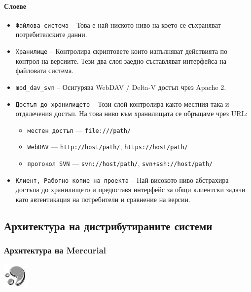 \documentclass[a4paper]{article}
\def\Hg{Mercurial}
\begin{document}
    \paragraph{Слоеве}

    \begin{itemize}
      \item \texttt{Файлова система} -- Това е най-ниското ниво на което се
      съхраняват потребителските данни.
      \item \texttt{Хранилище} -- Контролира скриптовете които изпълняват действията по
      контрол на версиите. Тези два слоя заедно съставляват интерфейса на
      файловата система.
      \item \texttt{mod\_dav\_svn} -- Осигурява WebDAV / Delta-V достъп чрез Apache 2.
      \item \texttt{Достъп до хранилището} -- Този слой контролира както местния
      така и отдалечения достъп. На това ниво към хранилищата се обръщаме чрез
      URL:
        \begin{itemize}
          \item \texttt{местен достъп} --- \texttt{file:///path/}
          \item \texttt{WebDAV} --- \texttt{http://host/path/}, \quad \texttt{https://host/path/}
          \item \texttt{протокол SVN} --- \texttt{svn://host/path/}, \quad \texttt{svn+ssh://host/path/}
        \end{itemize}
      \item \texttt{Клиент, Работно копие на проекта} -- Най-високото ниво абстрахира
      достъпа до хранилището и предоставя интерфейс за общи клиентски задачи
      като автентикация на потребители и сравнение на версии.
    \end{itemize}

  \subsection{Архитектура на дистрибутираните системи}

    \subsubsection{Архитектура на \Hg}
    \includegraphics[scale=1.0]{hg_icon}
\end{document}

